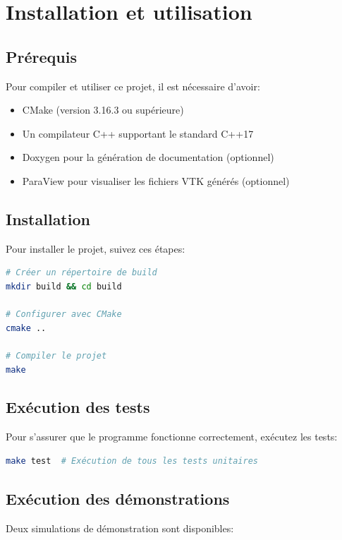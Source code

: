 \documentclass[12pt,a4paper]{article}
\begin{document}
\section{Installation et utilisation}

\subsection{Prérequis}

Pour compiler et utiliser ce projet, il est nécessaire d'avoir:
\begin{itemize}
    \item CMake (version 3.16.3 ou supérieure)
    \item Un compilateur C++ supportant le standard C++17
    \item Doxygen pour la génération de documentation (optionnel)
    \item ParaView pour visualiser les fichiers VTK générés (optionnel)
\end{itemize}

\subsection{Installation}

Pour installer le projet, suivez ces étapes:

\begin{lstlisting}[language=bash]
# Créer un répertoire de build
mkdir build && cd build

# Configurer avec CMake
cmake ..

# Compiler le projet
make
\end{lstlisting}

\subsection{Exécution des tests}

Pour s'assurer que le programme fonctionne correctement, exécutez les tests:

\begin{lstlisting}[language=bash]
make test  # Exécution de tous les tests unitaires
\end{lstlisting}

\subsection{Exécution des démonstrations}

Deux simulations de démonstration sont disponibles:
\end{document}
